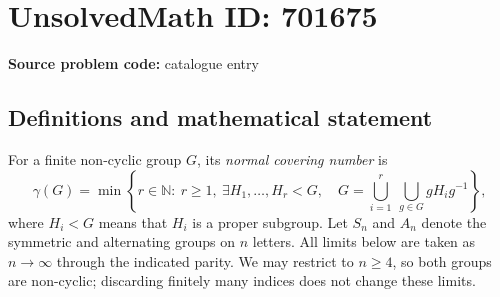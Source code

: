 \documentclass[11pt]{article}
\newcommand{\N}{\mathbb{N}}
\begin{document}
\section*{UnsolvedMath ID: 701675}
\textbf{Source problem code:} catalogue entry
\subsection{Definitions and mathematical statement}
For a finite non-cyclic group \(G\), its \emph{normal covering number} is
\[
\gamma(G)=\min\left\{r\in\N:\ r\geq1,\ \exists H_1,\ldots,H_r<G,\quad G=\bigcup_{i=1}^{r}\ \bigcup_{g\in G}gH_i g^{-1}\right\},
\]
where \(H_i<G\) means that \(H_i\) is a proper subgroup. Let \(S_n\) and \(A_n\) denote the symmetric and alternating groups on \(n\) letters. All limits below are taken as \(n\to\infty\) through the indicated parity. We may restrict to \(n\geq4\), so both groups are non-cyclic; discarding finitely many indices does not change these limits.
\end{document}
